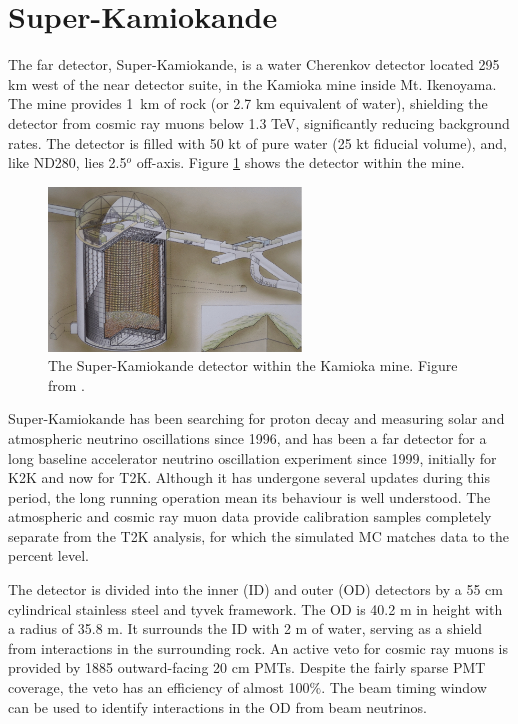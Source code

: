 \section{Super-Kamiokande}\label{sec:SK}

The far detector, Super-Kamiokande, is a water Cherenkov detector located 295 km west of the near detector suite, in the Kamioka mine inside Mt. Ikenoyama. The mine provides 1~km of rock (or 2.7 km equivalent of water), shielding the detector from cosmic ray muons below 1.3 TeV, significantly reducing background rates. The detector is filled with 50 kt of pure water (25 kt fiducial volume), and, like ND280, lies 2.5$^o$ off-axis. Figure \ref{fig:superk} shows the detector within the mine.

\begin{figure}[!htbp]
\centering
\includegraphics*[width=0.6\textwidth,clip]{figs/Superk}
\caption{The Super-Kamiokande detector within the Kamioka mine. Figure from \cite{tript}.}\label{fig:superk}
\end{figure}

Super-Kamiokande has been searching for proton decay and measuring solar and atmospheric neutrino oscillations since 1996, and has been a far detector for a long baseline accelerator neutrino oscillation experiment since 1999, initially for K2K and now for T2K. Although it has undergone several updates during this period, the long running operation mean its behaviour is well understood. The atmospheric and cosmic ray muon data provide calibration samples completely separate from the T2K analysis, for which the simulated MC matches data to the percent level.

The detector is divided into the inner (ID) and outer (OD) detectors by a 55 cm cylindrical stainless steel and tyvek framework. The OD is 40.2 m in height with a radius of 35.8 m. It surrounds the ID with 2 m of water, serving as a shield from interactions in the surrounding rock. An active veto for cosmic ray muons is provided by 1885 outward-facing 20 cm PMTs. Despite the fairly sparse PMT coverage, the veto has an efficiency of almost 100$\%$. The beam timing window can be used to identify interactions in the OD from beam neutrinos.

